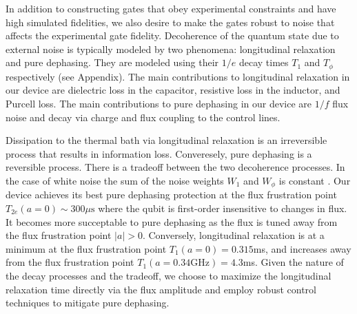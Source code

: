 \documentclass[
  amsfonts,
  amsmath,
  tbtags,
  amssymb,
  aps,
  nobibnotes,
  twocolumn,
  superscriptaddress,
]{revtex4-2}
\begin{document}
In addition to constructing gates
that obey experimental constraints and have high simulated fidelities,
we also desire to make the gates robust to noise that affects the experimental
gate fidelity. Decoherence of the quantum state due to external noise
is typically modeled by two phenomena: longitudinal relaxation and pure dephasing.
They are modeled using their $1/e$ decay times $T_{1}$ and $T_{\phi}$ respectively
(see Appendix).
The main contributions to longitudinal relaxation in our
device are dielectric loss in the capacitor, resistive loss in the inductor,
and Purcell loss. The main contributions to pure dephasing in our
device are $1/f$ flux noise and decay via charge and flux coupling
to the control lines.

Dissipation to the thermal bath via longitudinal
relaxation is an irreversible process
that results in information loss.
Converesely, pure dephasing is a reversible process.
There is a tradeoff between the two decoherence processes. In the case of white
noise the sum of the noise weights $W_{1}$ and $W_{\phi}$
is constant \cite{huang2020engineering}.
Our device achieves its best pure dephasing
protection at the flux frustration point
$T_{2e}(a = 0) \sim 300 \mu\textrm{s}$
where the qubit is first-order insensitive to changes in flux.
It becomes more succeptable to pure dephasing as the flux is tuned away from the flux
frustration point $|a| > 0$. Conversely, longitudinal relaxation is at a minimum
at the flux frustration point $T_{1}(a = 0) = 0.315$ms,
and increases away from the flux frustration point
$T_{1}(a = 0.34 \textrm{GHz}) = 4.3$ms. Given the nature
of the decay processes and the tradeoff, we choose
to maximize the longitudinal relaxation time directly
via the flux amplitude and employ robust control techniques to mitigate
pure dephasing.
\end{document}
